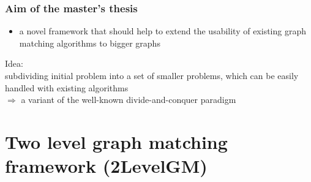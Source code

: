 \documentclass[hyperref={pdfpagelabels=false}]{beamer}
\begin{document}
\begin{frame}
\frametitle{Aim of the master's thesis}


\begin{itemize}
\item a novel framework that should help to extend the usability
of existing graph matching algorithms to bigger graphs
\end{itemize}
\vspace{10pt}
Idea:\\
\hspace{10pt} subdividing initial problem into a set of smaller problems, which can be easily handled with existing algorithms\\
\hspace{10pt}$\Rightarrow$ a variant of the well-known divide-and-conquer paradigm

\end{frame}
\section{Two level graph matching framework (2LevelGM)}
\end{document}
